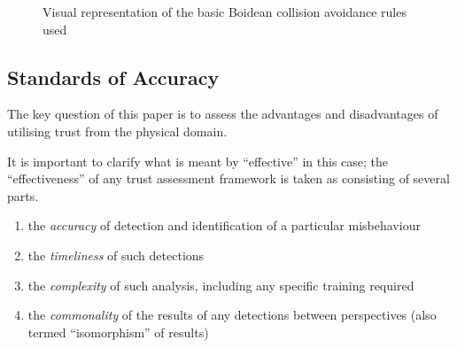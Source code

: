 \documentclass[conference]{IEEEtran}
\begin{document}
\begin{figure}
  \centering
  \caption{Visual representation of the basic Boidean collision avoidance rules used}
  \label{fig:boids}
\end{figure}



\subsection{Standards of Accuracy}

The key question of this paper is to assess the advantages and disadvantages of utilising trust from the physical domain. 

It is important to clarify what is meant by ``effective'' in this case; the ``effectiveness'' of any trust assessment framework is taken as consisting of several parts.

\begin{enumerate}
  \item the \emph{accuracy} of detection and identification of a particular misbehaviour
  \item the \emph{timeliness} of such detections
  \item the \emph{complexity} of such analysis, including any specific training required
  \item the \emph{commonality} of the results of any detections between perspectives (also termed ``isomorphism'' of results)
\end{enumerate}
\end{document}
